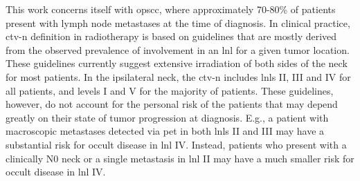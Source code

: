 \documentclass[twocolumn]{aastex631}
\begin{document}

This work concerns itself with \gls{opscc}, where approximately 70-80\% of patients present with lymph node metastases at the time of diagnosis.  
In clinical practice, \gls{ctv-n} definition in radiotherapy is based on guidelines \cite{gregoire_ct-based_2003,gregoire_delineation_2014,gregoire_delineation_2018,eisbruch_intensity-modulated_2002,biau_selection_2019,chao_determination_2002,vorwerk_guidelines_2011,ferlito_elective_2009} that are mostly derived from the observed prevalence of involvement in an \gls{lnl} for a given tumor location. These guidelines currently suggest extensive irradiation of both sides of the neck for most patients. In the ipsilateral neck, the \gls{ctv-n} includes \glspl{lnl} II, III and IV for all patients, and levels I and V for the majority of patients. These guidelines, however, do not account for the personal risk of the patients that may depend greatly on their state of tumor progression at diagnosis. E.g., a patient with macroscopic metastases detected via \gls{pet} in both \glspl{lnl} II and III may have a substantial risk for occult disease in \gls{lnl} IV. Instead, patients who present with a clinically N0 neck or a single metastasis in \gls{lnl} II may have a much smaller risk for occult disease in \gls{lnl} IV.
\end{document}
